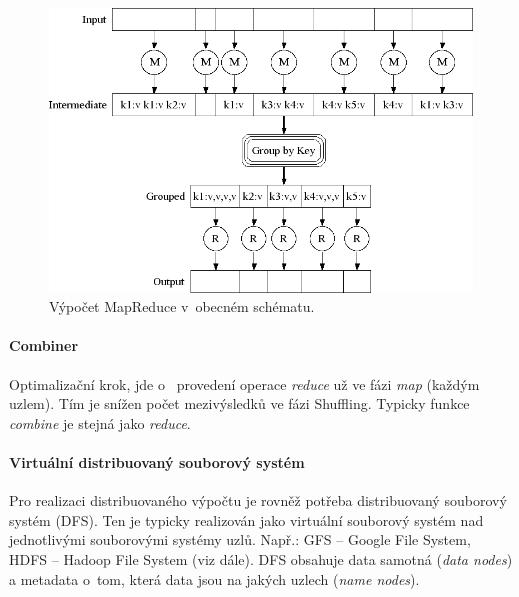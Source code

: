 \begin{figure}[H]
    \centering
    \includegraphics[width=1\linewidth]{map_reduce_general_p1.png}
    \caption{Výpočet MapReduce v~obecném schématu.}
\end{figure}

\paragraph*{Combiner} Optimalizační krok, jde o~ provedení operace \textit{reduce} už ve fázi \textit{map} (každým uzlem). Tím je snížen počet mezivýsledků ve fázi Shuffling. Typicky funkce \textit{combine} je stejná jako \textit{reduce}.

\paragraph*{Virtuální distribuovaný souborový systém} Pro realizaci distribuovaného výpočtu je rovněž potřeba distribuovaný souborový systém (DFS). Ten je typicky realizován jako virtuální souborový systém nad jednotlivými souborovými systémy uzlů. Např.: GFS -- Google File System, HDFS -- Hadoop File System (viz dále). DFS obsahuje data samotná (\textit{data nodes}) a metadata o~tom, která data jsou na jakých uzlech (\textit{name nodes}).

